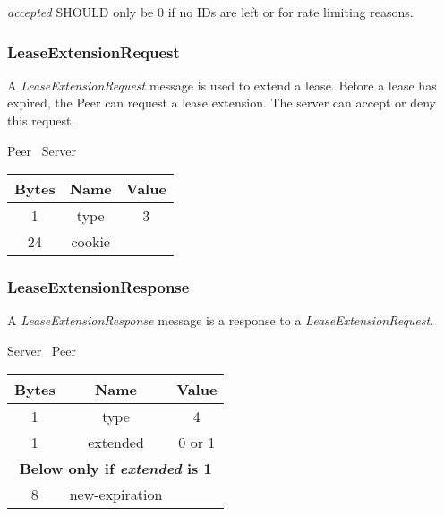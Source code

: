 \documentclass{article}
\begin{document}
    \emph{accepted} SHOULD only be 0 if no IDs are left or for rate limiting reasons.

    \subsubsection{LeaseExtensionRequest}

    A \emph{LeaseExtensionRequest} message is used to extend a lease. Before a lease has expired, the Peer can
    request a lease extension. The server can accept or deny this request.

    \begin{center}
        Peer \textrightarrow\ Server\\
        \begin{tabular}{|c|c|c|}
            \hline
            \textbf{Bytes} & \textbf{Name} & \textbf{Value} \\
            \hline
            1              & type          & 3              \\
            \hline
            24             & cookie        &                \\
            \hline
        \end{tabular}
    \end{center}

    \subsubsection{LeaseExtensionResponse}

    A \emph{LeaseExtensionResponse} message is a response to a \emph{LeaseExtensionRequest}.

    \begin{center}
        Server \textrightarrow\ Peer\\
        \begin{tabular}{|c|c|c|}
            \hline
            \textbf{Bytes} & \textbf{Name}  & \textbf{Value} \\
            \hline
            1              & type           & 4              \\
            \hline
            1              & extended       & 0 or 1         \\
            \hline
            \multicolumn{3}{|c|}{\textbf{Below only if \emph{extended} is 1} } \\
            \hline
            8              & new-expiration &                \\
            \hline
        \end{tabular}
    \end{center}
\end{document}
